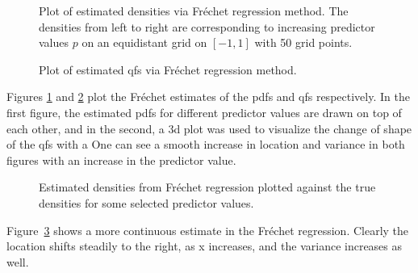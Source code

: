 \begin{figure}[h!]
    \centering
    \resizebox{1\textwidth}{!}{}
    \caption[Estimated pdfs from Fréchet method]{Plot of estimated densities via Fréchet regression method.
    The densities from left to right are corresponding to increasing predictor values $p$ on an
    equidistant grid on $[-1,1]$ with 50 grid points.}
    \label{fig:frechet_estimates}
\end{figure}

\begin{figure}[h!]
    \centering
    \resizebox{1\textwidth}{!}{}
    \caption[Estimated qfs from Fréchet method]{Plot of estimated qfs via Fréchet regression method.}
    \label{fig:frechet_estimates_3d}
\end{figure}

Figures \ref{fig:frechet_estimates} and \ref{fig:frechet_estimates_3d} plot the Fréchet
estimates of the pdfs and qfs respectively. In the first figure, the estimated pdfs for
different predictor values are drawn on top of each other, and in the second, a 3d plot
was used to visualize the change of shape of the qfs with a One can see a smooth
increase in location and variance in both figures with an increase in the predictor
value.


\begin{figure}[h!]
    \centering
    \resizebox{1\textwidth}{!}{}
    \caption[Comparison: estimated vs. true densities --- Fréchet]{Estimated
    densities from Fréchet regression plotted against the true densities for some selected
    predictor values.}
    \label{fig:frechet_est_vs_true}
\end{figure}
Figure~\ref{fig:frechet_est_vs_true} shows a more continuous estimate in the Fréchet
regression. Clearly the location shifts steadily to the right, as x increases, and the
variance increases as well.

